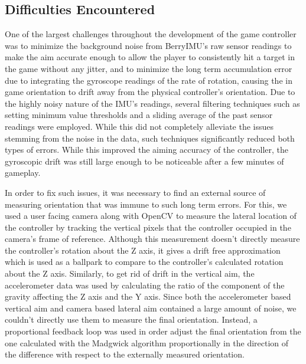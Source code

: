 \documentclass[titlepage, 12pt]{scrartcl}
\begin{document}
    \subsection{Difficulties Encountered}
    One of the largest challenges throughout the development of the game controller was to minimize the background noise from BerryIMU's raw sensor readings to make the aim accurate enough to allow the player to consistently hit a target in the game without any jitter, and to minimize the long term accumulation error due to integrating the gyroscope readings of the rate of rotation, causing the in game orientation to drift away from the physical controller's orientation. Due to the highly noisy nature of the IMU's readings, several filtering techniques such as setting minimum value thresholds and a sliding average of the past sensor readings were employed. While this did not completely alleviate the issues stemming from the noise in the data, such techniques significantly reduced both types of errors. While this improved the aiming accuracy of the controller, the gyroscopic drift was still large enough to be noticeable after a few minutes of gameplay. \par
    In order to fix such issues, it was necessary to find an external source of measuring orientation that was immune to such long term errors. For this, we used a user facing camera along with OpenCV to measure the lateral location of the controller by tracking the vertical pixels that the controller occupied in the camera's frame of reference. Although this measurement doesn't directly measure the controller's rotation about the Z axis, it gives a drift free approximation which is used as a ballpark to compare to the controller's calculated rotation about the Z axis. Similarly, to get rid of drift in the vertical aim, the accelerometer data was used by calculating the ratio of the component of the gravity affecting the Z axis and the Y axis. Since both the accelerometer based vertical aim and camera based lateral aim contained a large amount of noise, we couldn't directly use them to measure the final orientation. Instead, a proportional feedback loop was used in order adjust the final orientation from the one calculated with the Madgwick algorithm proportionally in the direction of the difference with respect to the externally measured orientation. \par
\end{document}
